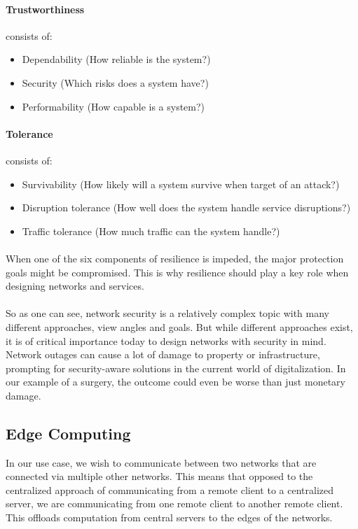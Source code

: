 \paragraph{Trustworthiness} consists of:
\begin{itemize}
    \item Dependability (How reliable is the system?)
    \item Security (Which risks does a system have?)
    \item Performability (How capable is a system?)
\end{itemize}

\paragraph{Tolerance} consists of:
\begin{itemize}
    \item Survivability (How likely will a system survive when target of an attack?)
    \item Disruption tolerance (How well does the system handle service disruptions?)
    \item Traffic tolerance (How much traffic can the system handle?)
\end{itemize}

\paragraph{}When one of the six components of resilience is impeded, the major protection goals might be compromised. This is why resilience should play a key role when designing networks and services.

\paragraph{}So as one can see, network security is a relatively complex topic with many different approaches, view angles and goals. But while different approaches exist, it is of critical importance today to design networks with security in mind. Network outages can cause a lot of damage to property or infrastructure, prompting for security-aware solutions in the current world of digitalization. In our example of a surgery, the outcome could even be worse than just monetary damage.

\subsection{Edge Computing}
In our use case, we wish to communicate between two networks that are connected via multiple other networks. This means that opposed to the centralized approach of communicating from a remote client to a centralized server, we are communicating from one remote client to another remote client. This offloads computation from central servers to the edges of the networks.

